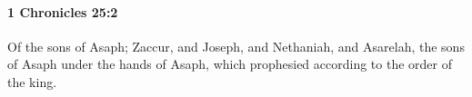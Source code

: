 
		\paragraph{1 Chronicles 25:2} %
			\label{1CHRONICLES-25-2}

			Of the sons of Asaph; Zaccur, and Joseph, and Nethaniah, and Asarelah, the sons of Asaph under the hands of Asaph, which prophesied according to the order of the king.


